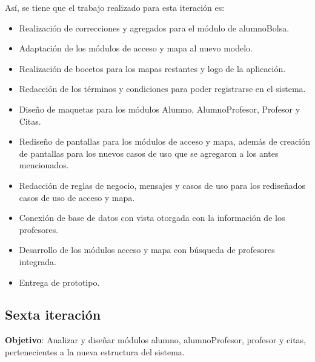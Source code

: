 Así, se tiene que el trabajo realizado para esta iteración es: 
\begin{itemize}
	\item Realización de correcciones y agregados para el módulo de alumnoBolsa.
	\item Adaptación de los módulos de acceso y mapa al nuevo modelo.
	\item Realización de bocetos para los mapas restantes y logo de la aplicación.
	\item Redacción de los términos y condiciones para poder registrarse en el sistema.
	\item Diseño de maquetas para los módulos Alumno, AlumnoProfesor, Profesor y Citas.
	\item Rediseño de pantallas para los módulos de acceso y mapa, además de creación de pantallas para los nuevos casos de uso que se agregaron a los antes mencionados.
	\item Redacción de reglas de negocio, mensajes y casos de uso para los rediseñados casos de uso de acceso y mapa.
	\item Conexión de base de datos con vista otorgada con la información de los profesores.
	\item Desarrollo de los módulos acceso y mapa con búsqueda de profesores integrada.
	\item Entrega de prototipo.
\end{itemize}


\subsection{Sexta iteración}

\noindent
\textbf{Objetivo}: Analizar y diseñar módulos alumno, alumnoProfesor, profesor y citas, pertenecientes a la nueva estructura del sistema.
\newline


